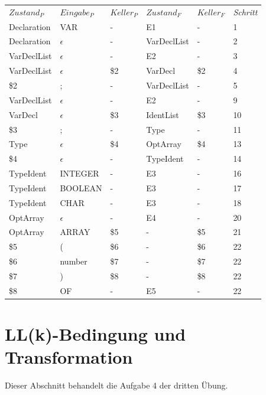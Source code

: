 \documentclass[11pt, a4paper, twoside]{article}   	%
\begin{document}
\begin{tabularx}{\textwidth}{X X X X X X}
  \emph{$Zustand_P$} & \emph{$Eingabe_P$} & \emph{$Keller_P$} & \emph{$Zustand_F$} & \emph{$Keller_F$} & \emph{Schritt} \\
  Declaration & VAR         & -    & E1          & -     & 1 \\
  Declaration & $\epsilon$  & -    & VarDeclList & -     & 2 \\
  VarDeclList & $\epsilon$  & -    & E2          & -     & 3 \\
  VarDeclList & $\epsilon$  & \$2  & VarDecl     & \$2   & 4 \\
  \$2         & ;           & -    & VarDeclList & -   & 5 \\
  VarDeclList & $\epsilon$  & -    & E2          & -     & 9 \\
  VarDecl     & $\epsilon$  & \$3  & IdentList   & \$3   & 10 \\
  \$3         & ;           & -    & Type        & -     & 11 \\
  Type        & $\epsilon$  & \$4  & OptArray    & \$4   & 13 \\
  \$4         & $\epsilon$  & -    & TypeIdent   & -     & 14 \\
  TypeIdent   & INTEGER     & -    & E3          & -     & 16 \\
  TypeIdent   & BOOLEAN     & -    & E3          & -     & 17 \\
  TypeIdent   & CHAR        & -    & E3          & -     & 18 \\
  OptArray    & $\epsilon$  & -    & E4          & -     & 20 \\
  OptArray    & ARRAY       & \$5  & -           & \$5   & 21 \\
  \$5         & (           & \$6  & -           & \$6   & 22 \\
  \$6         & number      & \$7  & -           & \$7   & 22 \\
  \$7         & )           & \$8  & -           & \$8   & 22 \\
  \$8         & OF          & -    & E5          & -     & 22 \\
 \end{tabularx}
 
\section{LL(k)-Bedingung und Transformation}
Dieser Abschnitt behandelt die Aufgabe 4 der dritten Übung.
\end{document}
